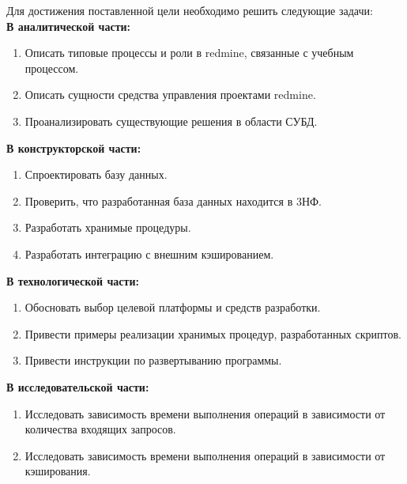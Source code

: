 Для достижения поставленной цели необходимо решить следующие задачи: \\
\textbf{В аналитической части:}
\begin{enumerate}
\item Описать типовые процессы и роли в redmine, связанные с учебным процессом.
\item Описать сущности средства управления проектами redmine.
\item Проанализировать существующие решения в области СУБД.
\end{enumerate}
\textbf{В конструкторской части:}
\begin{enumerate}
\item Спроектировать базу данных.
\item Проверить, что разработанная база данных находится в 3НФ.
\item Разработать хранимые процедуры.
\item Разработать интеграцию с внешним кэшированием.
\end{enumerate}
\textbf{В технологической части:}
\begin{enumerate}
    \item Обосновать выбор целевой платформы и средств разработки.
    \item Привести примеры реализации хранимых процедур, разработанных скриптов.
    \item Привести инструкции по развертыванию программы.
\end{enumerate}
\textbf{В исследовательской части:}
\begin{enumerate}
    \item Исследовать зависимость времени выполнения операций в зависимости от количества входящих запросов.
    \item Исследовать зависимость времени выполнения операций в зависимости от кэширования.
\end{enumerate}

\clearpage

